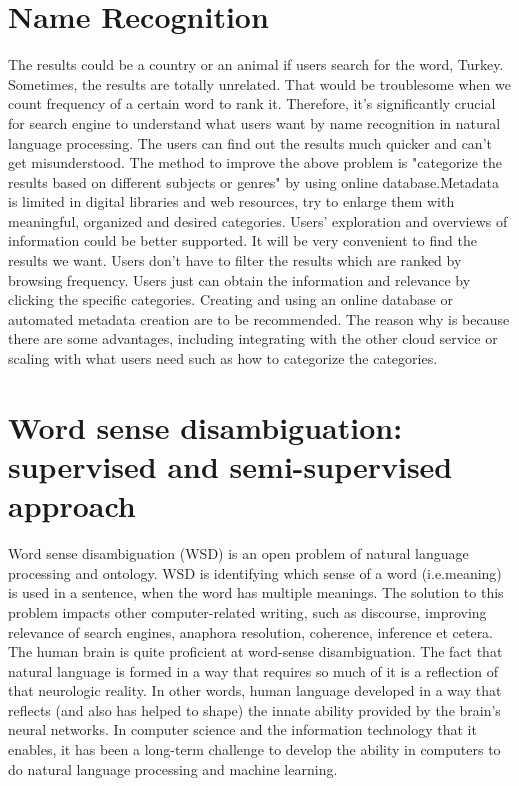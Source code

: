 \section*{Name Recognition}
The results could be a country or an animal if users search for the word, Turkey. Sometimes, the results are totally unrelated. That would be troublesome when we count frequency of a certain word to rank it. 
Therefore, it's significantly crucial for search engine to understand what users want by name recognition in natural language processing. The users can find out the results much quicker and can't get misunderstood.
The method to improve the above problem is "categorize the results based on different subjects or genres" by using online database.Metadata is limited in digital libraries and web resources, try to enlarge them with meaningful, organized and desired categories.\cite{Bill2006, Categorizing Web Search Results into Meaningful and Stable Categories Using Fast-Feature Techniques}
Users' exploration and overviews of information could be better supported. It will be very convenient to find the results we want.\cite{Jin2008, Effectiveness Web Search Results for Genre and Sentiment Classification} Users don't have to filter the results which are ranked by browsing frequency. Users just can obtain the information and relevance by clicking the specific categories. 
Creating and using an online database or automated metadata creation are to be recommended. The reason why is because there are some advantages, including integrating with the other cloud service or scaling with what users need such as how to categorize the categories.\\


\section*{Word sense disambiguation: supervised and semi-supervised approach}

Word sense disambiguation (WSD) is an open problem of natural language processing and ontology. WSD is identifying which sense of a word (i.e.meaning) is used in a sentence, when the word has multiple meanings. The solution to this problem impacts other computer-related writing, such as discourse, improving relevance of search engines, anaphora resolution, coherence, inference et cetera.
The human brain is quite proficient at word-sense disambiguation. The fact that natural language is formed in a way that requires so much of it is a reflection of that neurologic reality. In other words, human language developed in a way that reflects (and also has helped to shape) the innate ability provided by the brain's neural networks. In computer science and the information technology that it enables, it has been a long-term challenge to develop the ability in computers to do natural language processing and machine learning.
